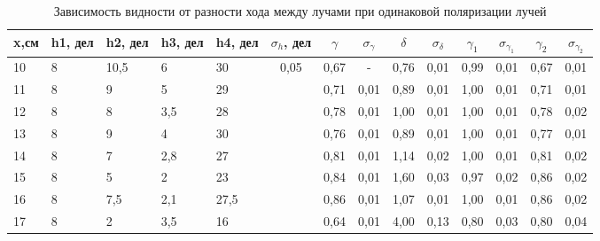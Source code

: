 \documentclass[a4paper,12pt]{report}
\begin{document}
\begin{table}[H]
\begin{center}
\caption{Зависимость видности от разности хода между лучами при одинаковой поляризации лучей}
\begin{tabular}{|p{0.8cm}|p{0.6cm}|p{0.6cm}|p{0.6cm}|p{0.6cm}|c|c|c|c|c|c|c|c|c|}
\hline
x,см & h1, дел & h2, дел & h3, дел & h4, дел & $\sigma_h$, дел           & $\gamma$ & $\sigma_{\gamma}$ & $\delta$ & $\sigma_{\delta}$ & $\gamma_{1}$ & $\sigma_\gamma_{1}$ & $\gamma_{2}$ & $\sigma_{\gamma_{2}}$ \\\hline
10    & 8       & 10,5    & 6       & 30      & \multirow{32}{*}{0,05} & 0,67  & -        & 0,76  & 0,01        & 0,99         & 0,01               & 0,67         & 0,01               \\ \cline{1-5} \cline{7-14} 
11    & 8       & 9       & 5       & 29      &                        & 0,71  & 0,01        & 0,89  & 0,01        & 1,00         & 0,01               & 0,71         & 0,01               \\ \cline{1-5} \cline{7-14} 
12    & 8       & 8       & 3,5     & 28      &                        & 0,78  & 0,01        & 1,00  & 0,01        & 1,00         & 0,01               & 0,78         & 0,02               \\ \cline{1-5} \cline{7-14} 
13    & 8       & 9       & 4       & 30      &                        & 0,76  & 0,01        & 0,89  & 0,01        & 1,00         & 0,01               & 0,77         & 0,01               \\ \cline{1-5} \cline{7-14} 
14    & 8       & 7       & 2,8     & 27      &                        & 0,81  & 0,01        & 1,14  & 0,02        & 1,00         & 0,01               & 0,81         & 0,02               \\ \cline{1-5} \cline{7-14} 
15    & 8       & 5       & 2       & 23      &                        & 0,84  & 0,01        & 1,60  & 0,03        & 0,97         & 0,02               & 0,86         & 0,02               \\ \cline{1-5} \cline{7-14} 
16    & 8       & 7,5     & 2,1     & 27,5    &                        & 0,86  & 0,01        & 1,07  & 0,01        & 1,00         & 0,01               & 0,86         & 0,02               \\ \cline{1-5} \cline{7-14} 
17    & 8       & 2       & 3,5     & 16      &                        & 0,64  & 0,01        & 4,00  & 0,13        & 0,80         & 0,03               & 0,80         & 0,04               \\ \cline{1-5} \cline{7-14} 

\end{tabular}
\end{center}
\end{table}
\end{document}

